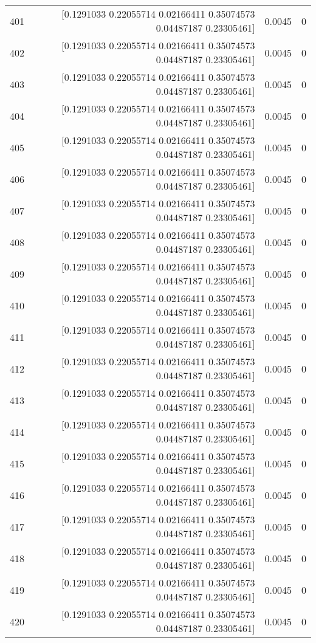 \begin{longtable}{lrrr}
401 & [0.1291033  0.22055714 0.02166411 0.35074573 0.04487187 0.23305461] & 0.0045 & 0 \\
402 & [0.1291033  0.22055714 0.02166411 0.35074573 0.04487187 0.23305461] & 0.0045 & 0 \\
403 & [0.1291033  0.22055714 0.02166411 0.35074573 0.04487187 0.23305461] & 0.0045 & 0 \\
404 & [0.1291033  0.22055714 0.02166411 0.35074573 0.04487187 0.23305461] & 0.0045 & 0 \\
405 & [0.1291033  0.22055714 0.02166411 0.35074573 0.04487187 0.23305461] & 0.0045 & 0 \\
406 & [0.1291033  0.22055714 0.02166411 0.35074573 0.04487187 0.23305461] & 0.0045 & 0 \\
407 & [0.1291033  0.22055714 0.02166411 0.35074573 0.04487187 0.23305461] & 0.0045 & 0 \\
408 & [0.1291033  0.22055714 0.02166411 0.35074573 0.04487187 0.23305461] & 0.0045 & 0 \\
409 & [0.1291033  0.22055714 0.02166411 0.35074573 0.04487187 0.23305461] & 0.0045 & 0 \\
410 & [0.1291033  0.22055714 0.02166411 0.35074573 0.04487187 0.23305461] & 0.0045 & 0 \\
411 & [0.1291033  0.22055714 0.02166411 0.35074573 0.04487187 0.23305461] & 0.0045 & 0 \\
412 & [0.1291033  0.22055714 0.02166411 0.35074573 0.04487187 0.23305461] & 0.0045 & 0 \\
413 & [0.1291033  0.22055714 0.02166411 0.35074573 0.04487187 0.23305461] & 0.0045 & 0 \\
414 & [0.1291033  0.22055714 0.02166411 0.35074573 0.04487187 0.23305461] & 0.0045 & 0 \\
415 & [0.1291033  0.22055714 0.02166411 0.35074573 0.04487187 0.23305461] & 0.0045 & 0 \\
416 & [0.1291033  0.22055714 0.02166411 0.35074573 0.04487187 0.23305461] & 0.0045 & 0 \\
417 & [0.1291033  0.22055714 0.02166411 0.35074573 0.04487187 0.23305461] & 0.0045 & 0 \\
418 & [0.1291033  0.22055714 0.02166411 0.35074573 0.04487187 0.23305461] & 0.0045 & 0 \\
419 & [0.1291033  0.22055714 0.02166411 0.35074573 0.04487187 0.23305461] & 0.0045 & 0 \\
420 & [0.1291033  0.22055714 0.02166411 0.35074573 0.04487187 0.23305461] & 0.0045 & 0 \\

\end{longtable}
